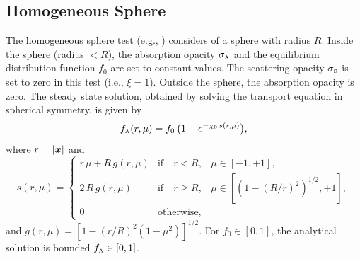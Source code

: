 \subsection{Homogeneous Sphere}

The homogeneous sphere test (e.g., \cite{smit_etal_1997}) considers of a sphere with radius $R$.  
Inside the sphere (radius $<R$), the absorption opacity $\sigma_{\mbox{\tiny A}}$ and the equilibrium distribution function $f_{0}$ are set to constant values.  
The scattering opacity $\sigma_{\mbox{\tiny S}}$ is set to zero in this test (i.e., $\xi=1$).  
Outside the sphere, the absorption opacity is zero.  
The steady state solution, obtained by solving the transport equation in spherical symmetry, is given by
\begin{equation}
  f_{\mbox{\tiny A}}(r,\mu)=f_{0}\,\big(1-e^{-\chi_{0}\,s(r,\mu)}\big),
  \label{eq:distributionHomogeneousSphere}
\end{equation}
where $r=|\boldsymbol{x}|$ and
\begin{equation}
  s(r,\mu)
  =\left\{
  \begin{array}{lll}
    r\,\mu+R\,g(r,\mu) & \mbox{if}\quad r<R, & \mu\in[-1,+1], \\
    2\,R\,g(r,\mu) & \mbox{if}\quad r \ge R, & \mu\in[(1-(R/r)^{2})^{1/2},+1], \\
    0 & \mbox{otherwise},
  \end{array}
  \right.
\end{equation}
and $g(r,\mu)=[1-(r/R)^{2}(1-\mu^{2})]^{1/2}$.  
For $f_{0}\in[0,1]$, the analytical solution is bounded $f_{\mbox{\tiny A}}\in[0,1]$.  

